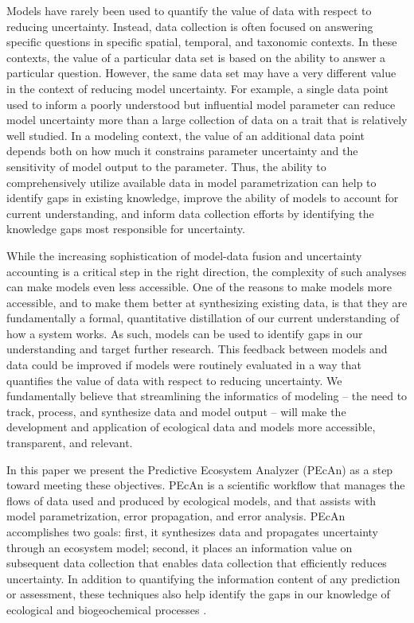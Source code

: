 \documentclass[12pt]{article}
\begin{document}
\begin{flushleft}
\begin{spacing}{1.9}
 Models have rarely been used to quantify the value of data with respect to reducing uncertainty.
 Instead, data collection is often focused on answering specific questions in specific spatial, temporal, and taxonomic contexts.
 In these contexts, the value of a particular data set is based on the ability to answer a particular question.
 However, the same data set may have a very different value in the context of reducing model uncertainty.
 For example, a single data point used to inform a poorly understood but influential model parameter can reduce model uncertainty more than a large collection of data on a trait that is relatively well studied.
 In a modeling context, the value of an additional data point depends both on how much it constrains parameter uncertainty and the sensitivity of model output to the parameter. 
 Thus, the ability to comprehensively utilize available data in model parametrization can help to identify gaps in existing knowledge, improve the ability of models to account for current understanding, and inform data collection efforts by identifying the knowledge gaps most responsible for uncertainty.

 While the increasing sophistication of model-data fusion and uncertainty accounting is a critical step in the right direction, the complexity of such analyses can make models even less accessible.
 One of the reasons to make models more accessible, and to make them better at synthesizing existing data, is that they are fundamentally a formal, quantitative distillation of our current understanding of how a system works.
 As such, models can be used to identify gaps in our understanding and target further research.
 This feedback between models and data could be improved if models were routinely evaluated in a way that quantifies the value of data with respect to reducing uncertainty.
 We fundamentally believe that streamlining the informatics of modeling -- the need to track, process, and synthesize data and model output -- will make the development and application of ecological data and models more accessible, transparent, and relevant.

 In this paper we present the Predictive Ecosystem Analyzer (PEcAn) as a step toward meeting these objectives.
 PEcAn is a scientific workflow that manages the flows of data used and produced by ecological models, and that assists with model parametrization, error propagation, and error analysis.
 PEcAn accomplishes two goals: first, it synthesizes data and propagates uncertainty through an ecosystem model; second, it  places an information value on subsequent data collection that enables data collection that efficiently reduces uncertainty.
 In addition to quantifying the information content of any prediction or assessment, these techniques also help identify the gaps in our knowledge of ecological and biogeochemical processes \citep{saltelli2008gsa}.


\end{spacing}
\end{flushleft}
\end{document}

